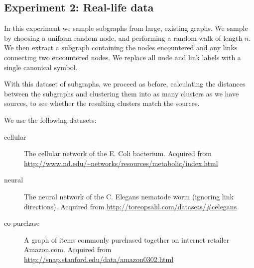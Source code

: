 \documentclass{article}
\begin{document}
\subsection*{Experiment 2: Real-life data} 

In this experiment we sample subgraphs from large, existing graphs. We sample by choosing a uniform random node, and performing a random walk of length $n$. We then extract a subgraph containing the nodes encountered and any links connecting two encountered nodes. We replace all node  and link labels with a single canonical symbol.

With this dataset of subgraphs, we proceed as before, calculating the distances between the subgraphs and clustering them into as many clusters as we have sources, to see whether the resulting clusters match the sources.

We use the following datasets:
\begin{description}
	\item[cellular] The cellular network of the E. Coli bacterium. \cite{jeong2000large} Acquired from \url{http://www.nd.edu/~networks/resources/metabolic/index.html}
	\item[neural] The neural network of the C. Elegans nematode worm (ignoring link directions). \cite{achacoso1991ay, watts1998small} Acquired from \url{http://toreopsahl.com/datasets/#celegans}
	\item[co-purchase] A graph of items commonly purchased together on internet retailer Amazon.com. \cite{leskovec2007dynamics} Acquired from \url{http://snap.stanford.edu/data/amazon0302.html}
\end{description}


%  
\end{document}
